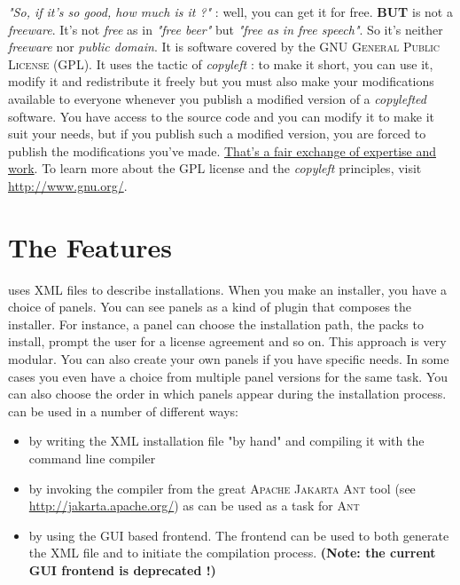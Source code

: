 \textit{"So, if it's so good, how much is it ?"} : well, you can get it
for free. \textbf{BUT} \IzPack is not a \textit{freeware}. It's not
\textit{free} as in \textit{"free beer"} but \textit{"free as in free
speech"}. So it's neither \textit{freeware} nor \textit{public domain}.
It is software covered by the \textsc{GNU General Public License} (GPL).
It uses the tactic of \textit{copyleft} : to make it short, you can use
it, modify it and redistribute it freely but you must also make your
modifications available to everyone whenever you publish a modified
version of a \textit{copylefted} software. You have access to the
\IzPack source code and you can modify it to make it suit your needs,
but if you publish such a modified version, you are forced to publish
the modifications you've made. \underline{That's a fair exchange of
expertise and  work}. To learn more about the GPL license and the
\textit{copyleft} principles, visit \mbox{\url{http://www.gnu.org/}}.\\

\section*{The Features}

\IzPack uses XML files to describe installations. When you make an
installer, you have a choice of panels. You can see panels as a kind of
plugin that composes the installer. For instance, a panel can choose the
installation path, the packs to install, prompt the user for a license
agreement and so on. This approach is very modular. You can also create
your own panels if you have specific needs. In some cases you even have
a choice from multiple panel versions for the same task. You can also
choose the order in which panels appear during the installation process.
\IzPack can be used in a number of different ways:
\begin{itemize}
  \item by writing the XML installation file "by hand" and compiling
  it with the command line compiler
  \item by invoking the compiler from the great \textsc{Apache Jakarta
  Ant} tool (see \url{http://jakarta.apache.org/}) as \IzPack can be
  used as a task for \textsc{Ant}
  \item by using the GUI based frontend. The frontend can be used to
  both generate the XML file and to initiate the compilation process.
  \textbf{(Note: the current GUI frontend is deprecated !)}
\end{itemize}\

